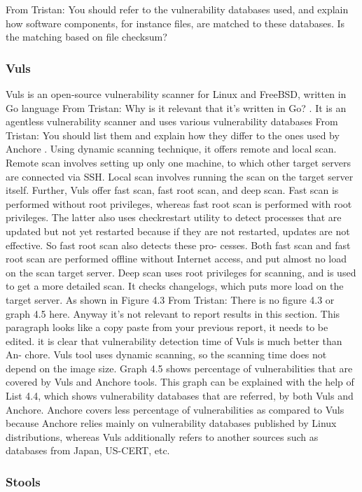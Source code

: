 \documentclass[a4paper,num-refs]{oup-contemporary}
\newcommand{\TG}[1]{\color{blue}From Tristan: #1 \color{black}}
\begin{document}
\TG{You should refer to the vulnerability databases used, and explain how
software components, for instance files, are matched to these databases. Is
the matching based on file checksum?}

\subsubsection{Vuls}

Vuls is an open-source vulnerability scanner for Linux and FreeBSD, written in Go
language \TG{Why is it relevant that it's written in Go?}.
 It is an agentless vulnerability scanner and uses various
vulnerability databases \TG{You should list them and explain how they differ to 
the ones used by Anchore}. Using dynamic scanning technique, it offers
remote and local scan. Remote scan involves setting up only one machine, to
which other target servers are connected via SSH. Local scan involves running
the scan on the target server itself. Further, Vuls offer fast scan, fast root scan,
and deep scan.
Fast scan is performed without root privileges, whereas fast root scan is
performed with root privileges. The latter also uses checkrestart utility to detect processes that are updated but not yet restarted because if they are not
restarted, updates are not effective. So fast root scan also detects these pro-
cesses. Both fast scan and fast root scan are performed offline without Internet
access, and put almost no load on the scan target server. Deep scan uses
root privileges for scanning, and is used to get a more detailed scan. It checks
changelogs, which puts more load on the target server. As shown in Figure 4.3 \TG{There is no figure 4.3 or graph 4.5 here. Anyway it's not relevant 
to report results in this section. This paragraph looks like a copy paste from your previous report, it needs to be edited.}
it is clear that vulnerability detection time of Vuls is much better than An-
chore. Vuls tool uses dynamic scanning, so the scanning time does not depend
on the image size.
Graph 4.5 shows percentage of vulnerabilities that are
covered by Vuls and Anchore tools. This graph can be explained with the help
of List 4.4, which shows vulnerability databases that are referred, by both Vuls
and Anchore. Anchore covers less percentage of vulnerabilities as compared
to Vuls because Anchore relies mainly on vulnerability databases published by
Linux distributions, whereas Vuls additionally refers to another sources such as
databases from Japan, US-CERT, etc.

\subsubsection{Stools}
\end{document}
